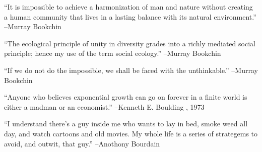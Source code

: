 \documentclass{article}%
\begin{document}
\linebreak%
\vspace{1mm}%
\begin{minipage}{\textwidth}%
\flushleft%
“It is impossible to achieve a harmonization of man and nature without creating a human community that lives in a lasting balance with its natural environment.”%
\linebreak%
\vspace{1mm}%
–Murray Bookchin%
\linebreak%
\vspace{1mm}%
\end{minipage}%
\linebreak%
\vspace{1mm}%
\begin{minipage}{\textwidth}%
\flushleft%
“The ecological principle of unity in diversity grades into a richly mediated social principle; hence my use of the term social ecology.”%
\linebreak%
\vspace{1mm}%
–Murray Bookchin%
\linebreak%
\vspace{1mm}%
\end{minipage}%
\linebreak%
\vspace{1mm}%
\begin{minipage}{\textwidth}%
\flushleft%
“If we do not do the impossible, we shall be faced with the unthinkable.”%
\linebreak%
\vspace{1mm}%
–Murray Bookchin%
\linebreak%
\vspace{1mm}%
\end{minipage}%
\linebreak%
\vspace{1mm}%
\begin{minipage}{\textwidth}%
\flushleft%
“Anyone who believes exponential growth can go on forever in a finite world is either a madman or an economist.”%
\linebreak%
\vspace{1mm}%
–Kenneth E. Boulding%
, 1973%
\linebreak%
\vspace{1mm}%
\end{minipage}%
\linebreak%
\vspace{1mm}%
\begin{minipage}{\textwidth}%
\flushleft%
“I understand there's a guy inside me who wants to lay in bed, smoke weed all day, and watch cartoons and old movies. My whole life is a series of strategems to avoid, and outwit, that guy.”%
\linebreak%
\vspace{1mm}%
–Anothony Bourdain%
\linebreak%
\vspace{1mm}%
\end{minipage}%
\end{document}
